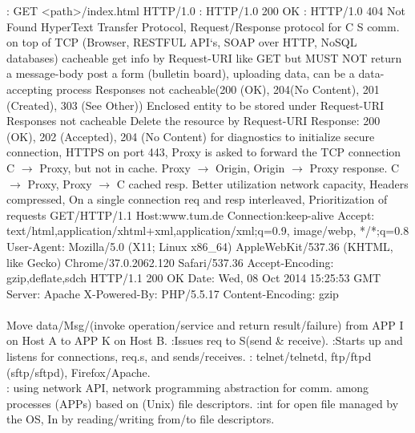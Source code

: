 : GET <path>/index.html HTTP/1.0
: HTTP/1.0 200 OK
: HTTP/1.0 404 Not Found 
\textbar \textbar
{}
HyperText Transfer Protocol,
Request/Response protocol for C S comm. on top of TCP
(Browser,
RESTFUL API‘s,
SOAP over HTTP,
NoSQL databases)
cacheable get info by Request-URI
 like GET but MUST NOT return a message-body
 post a form (bulletin board), uploading data,
can be a data-accepting process
Responses not cacheable(200 (OK), 204(No Content), 201
(Created), 303 (See Other)) 
 Enclosed entity to be stored under Request-URI
Responses not cacheable
 Delete the resource by Request-URI
Response: 200 (OK), 202 (Accepted), 204 (No Content)
 for diagnostics
 to initialize secure connection, HTTPS on port 443,
Proxy is asked to forward the TCP connection
\textbar
{}C  $\rightarrow$ Proxy, but not in cache. 
Proxy  $\rightarrow$ Origin, Origin $\rightarrow$ Proxy response.
C  $\rightarrow$ Proxy, Proxy $\rightarrow$ C cached resp.
\textbar
{}
Better utilization network capacity,
Headers compressed,
On a single connection req and resp interleaved,
Prioritization of requests
\textbar \textbar \textbar
GET/HTTP/1.1
Host:www.tum.de
Connection:keep-alive
Accept: text/html,application/xhtml+xml,application/xml;q=0.9, image/webp, */*;q=0.8
User-Agent: Mozilla/5.0 (X11; Linux x86\_64) AppleWebKit/537.36 (KHTML, like Gecko) Chrome/37.0.2062.120 Safari/537.36
Accept-Encoding: gzip,deflate,sdch
\textbar \textbar \textbar
HTTP/1.1 200 OK
Date: Wed, 08 Oct 2014 15:25:53 GMT
Server: Apache
X-Powered-By: PHP/5.5.17
Content-Encoding: gzip
%
%
%
\\
\\
Move data/Msg/(invoke operation/service and return result/failure) 
from APP I on Host A to APP K on Host B.
:Issues req to S(send \& receive).
:Starts up and listens for connections, req.s, and sends/receives.
:  telnet/telnetd, ftp/ftpd (sftp/sftpd), Firefox/Apache.
\\
: using network API, network programming abstraction for comm. among processes (APPs) based on (Unix) file
descriptors.
:int for open file managed by the OS, 
In  by reading/writing from/to file descriptors.
